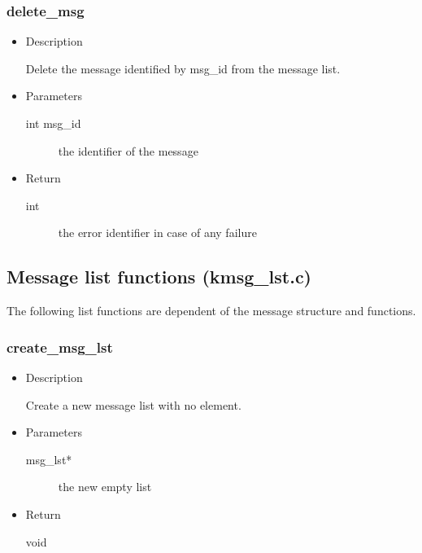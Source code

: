 \subsubsection{delete\_msg}
\begin{itemize}
  \item{Description}

	 Delete the message identified by msg\_id from the message list.
  \item{Parameters}
	 \begin{description}
		\item[int msg\_id] the identifier of the message
	 \end{description}
  \item{Return}
	 \begin{description}
		\item[int] the error identifier in case of any failure
	 \end{description}
\end{itemize}


\subsection{Message list functions (kmsg\_lst.c)}

The following list functions are dependent of the message structure and functions.

\subsubsection{create\_msg\_lst}
\begin{itemize}
  \item{Description}

	 Create a new message list with no element.
  \item{Parameters}
	 \begin{description}
		\item[msg\_lst*] the new empty list
	 \end{description}
  \item{Return}
	 \begin{description}
		\item[void]
	 \end{description}
\end{itemize}

